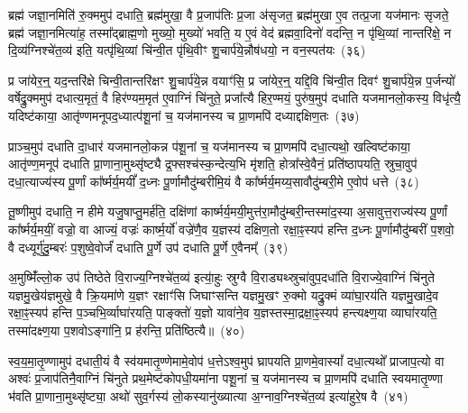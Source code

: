 {\anuvakamend[{इन्द्रः॑ प॒शुका॑मस्य भवत्यविश॒थ्सयो॑निं विꣳश॒तिश्च॑}]}%

ब्रह्म॑ जज्ञा॒नमिति॑ रु॒क्ममुप॑ दधाति॒ ब्रह्म॑मुखा॒ वै प्र॒जा\-प॑तिः प्र॒जा अ॑सृजत॒ ब्रह्म॑मुखा ए॒व तत्प्र॒जा यज॑मानः सृजते॒ ब्रह्म॑ जज्ञा॒नमित्या॑ह॒ तस्मा᳚द्ब्राह्म॒णो मुख्यो॒ मुख्यो॑ भवति॒ य ए॒वं वेद॑ ब्रह्मवा॒दिनो॑ वदन्ति॒ न पृ॑थि॒व्यां नान्तरि॑क्षे॒ न दि॒व्य॑ग्निश्चे॑त॒व्य॑ इति॒ यत्पृ॑थि॒व्यां चि॑न्वी॒त पृ॑थि॒वीꣳ शु॒चार्प॑ये॒न्नौष॑धयो॒ न वन॒स्पत॑यः~(३६)

प्र जा॑येर॒न्॒ यद॒न्तरि॑क्षे चिन्वी॒तान्तरि॑क्षꣳ शु॒चार्प॑ये॒न्न वयाꣳ॑सि॒ प्र जा॑येर॒न्॒ यद्दि॒वि चि॑न्वी॒त दिवꣳ॑ शु॒चार्प॑ये॒न्न प॒र्जन्यो॑ वर्\mbox{}षेद्रु॒क्ममुप॑ दधात्य॒मृतं॒ वै हिर॑ण्यम॒मृत॑ ए॒वाग्निं चि॑नुते॒ प्रजा᳚त्यै हिर॒ण्मयं॒ पुरु॑ष॒मुप॑ दधाति यजमानलो॒कस्य॒ विधृ॑त्यै॒ यदिष्ट॑काया॒ आतृ॑ण्णमनूपद॒ध्यात्प॑शू॒नां च॒ यज॑मानस्य च प्रा॒णमपि॑ दध्याद्दक्षिण॒तः~(३७)

प्राञ्च॒मुप॑ दधाति दा॒धार॑ यजमानलो॒कन्न प॑शू॒नां च॒ यज॑मानस्य च प्रा॒णमपि॑ दधा॒त्यथो॒ खल्विष्ट॑काया॒ आतृ॑ण्ण॒मनूप॑ दधाति प्रा॒णाना॒मुथ्सृ॑ष्ट्यै द्र॒फ्सश्च॑स्क॒न्देत्य॒भि मृ॑शति॒ होत्रा᳚स्वे॒वैनं॒ प्रति॑\-ष्ठापयति॒ स्रुचा॒वुप॑ दधा॒त्याज्य॑स्य पू॒र्णां का᳚र्ष्मर्य॒मयीं᳚ द॒ध्नः पू॒र्णामौदु॑म्बरीमि॒यं वै का᳚र्ष्मर्य॒मय्य॒सावौदु॑म्बरी॒मे ए॒वोप॑ धत्ते~(३८)

तू॒ष्णीमुप॑ दधाति॒ न हीमे यजु॒षाप्तु॒मर्\mbox{}ह॑ति॒ दक्षि॑णां कार्ष्मर्य॒मयी॒मुत्त॑रा॒मौदु॑म्बरी॒न्तस्मा॑द॒स्या अ॒सावुत्त॒राज्य॑स्य पू॒र्णां का᳚र्ष्मर्य॒मयीं॒ वज्रो॒ वा आज्यं॒ वज्रः॑ कार्ष्म॒र्यो॑ वज्रे॑णै॒व य॒ज्ञस्य॑ दक्षिण॒तो रक्षा॒ꣴ॒स्यप॑ हन्ति द॒ध्नः पू॒र्णामौदु॑म्बरीं प॒शवो॒ वै दध्यूर्गु॑दु॒म्बरः॑ प॒शुष्वे॒वोर्जं॑ दधाति पू॒र्णे उप॑ दधाति पू॒र्णे ए॒वैनम्᳚~(३९)

अ॒मुष्मिँ॑ल्लो॒क उप॑ तिष्ठेते वि॒राज्य॒ग्निश्चे॑त॒व्य॑ इत्या॒॑हुः स्रुग्वै वि॒राड्यथ्स्रुचा॑वुप॒दधा॑ति वि॒राज्ये॒वाग्निं चि॑नुते यज्ञमु॒खेय॑ज्ञमुखे॒ वै क्रि॒यमा॑णे य॒ज्ञꣳ रक्षाꣳ॑सि जिघाꣳसन्ति यज्ञमु॒खꣳ रु॒क्मो यद्रु॒क्मं व्या॑घा॒रय॑ति यज्ञमु॒खादे॒व रक्षा॒ꣴ॒स्यप॑ हन्ति प॒ञ्चभि॒र्व्याघा॑रयति॒ पाङ्क्तो॑ य॒ज्ञो यावा॑ने॒व य॒ज्ञस्तस्मा॒द्रक्षा॒ꣴ॒स्यप॑ हन्त्यक्ष्ण॒या व्याघा॑रयति॒ तस्मा॑दक्ष्ण॒या प॒शवो\-ऽङ्गा॑नि॒ प्र ह॑रन्ति॒ प्रति॑ष्ठित्यै॥~(४०)

{\anuvakamend[{वन॒स्पत॑यो दक्षिण॒तो ध॑त्त एन॒न्तस्मा॑दक्ष्ण॒या पञ्च॑ च}]}%

स्व॒य॒मा॒तृ॒ण्णामुप॑ दधाती॒यं वै स्व॑यमातृ॒ण्णेमामे॒वोप॑ ध॒त्ते\-ऽश्व॒मुप॑ घ्रापयति प्रा॒णमे॒वास्यां᳚ दधा॒त्यथो᳚ प्राजाप॒त्यो वा अश्वः॑ प्र॒जा\-प॑तिनै॒वाग्निं चि॑नुते प्रथ॒मेष्ट॑कोपधी॒यमा॑ना पशू॒नां च॒ यज॑मानस्य च प्रा॒णमपि॑ दधाति स्वयमातृ॒ण्णा भ॑वति प्रा॒णाना॒मुथ्सृ॑ष्ट्या॒ अथो॑ सुव॒र्गस्य॑ लो॒कस्यानु॑ख्यात्या अ॒ग्नाव॒ग्निश्चे॑त॒व्य॑ इत्या॑हुरे॒ष वै~(४१)

